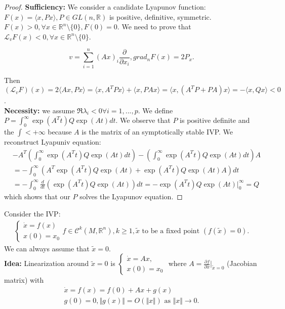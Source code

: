 \documentclass{article}
\theoremstyle{named}
\begin{document}
	
\begin{proof}
	\textbf{Sufficiency:} We consider a candidate Lyapunov function: $F(x) = \langle x, Px \rangle, P \in GL(n, \mathbb R)$ is positive, definitive, symmetric.\\
	
	$F(x) > 0, \forall x \in \mathbb R^n  \setminus \{0 \}, F(0) = 0.$ We need to prove that $\mathcal L_vF(x) < 0, \forall x \in \mathbb R^n \setminus \{  0 \}$. 
	
	\[
		v = \sum^n_{i=1} (Ax)_i \frac{\partial}{\partial x_i}, grad_n F(x) = 2 P_x.
	\]
	
	Then $(\mathcal L_v F)(x) = 2 \langle Ax, Px \rangle = \langle x , A^TPx \rangle + \langle x, PAx \rangle = \langle x, (A^TP+PA)x \rangle = - \langle x,Qx \rangle < 0$. \\
	
	\textbf{Necessity:} we assume $\Re \lambda_i < 0 \forall i=1,...,p$. We define $P = \int^\infty_0 \exp(A^Tt) Q \exp(At) dt$. We observe that $P$ is positive definite and the $\int < + \infty$ because $A$ is the matrix of an symptotically stable IVP. We reconstruct Lyapuniv equation: 
	\begin{align*}
		&- A^T (\int^\infty_0 \exp(A^Tt) Q \exp(At) dt) - (\int^\infty_0 \exp(A^Tt) Q\exp(At)dt)A \\
		&= - \int^\infty_0(A^T \exp(A^Tt) Q\exp(At) + \exp(A^Tt)Q\exp(At)A)dt \\
		&= - \int^\infty_0 \frac{d}{dt} (\exp(A^Tt)Q \exp(At)) dt = - \exp(A^Tt)Q\exp(At) \Big \vert^\infty_0 = Q
	\end{align*}
	which shows that our $P$ solves the Lyapunov equation.
\end{proof}

Consider the IVP:
\begin{align*}
\begin{cases}
\dot x = f(x) \\x(0) = x_0
\end{cases}
f \in \mathcal C^k(M, \mathbb R^n), k \geq 1, \tilde x \text{ to be a fixed point }(f(\tilde x) = 0).
\end{align*}
We can always assume that $\tilde x = 0$. \\

\textbf{Idea:} Linearization around $\tilde x = 0$ is $\begin{cases}\dot x = Ax,\\ x(0) = x_0\end{cases}$ where $A = \frac{\partial f}{\partial x} \Big \vert_{\tilde x = 0}$ (Jacobian matrix) with
\begin{gather*}
\dot x = f(x) = f(0) + Ax + g(x) \\
g(0) = 0, \Vert g(x) \Vert = O(\Vert x \Vert) \text{ as } \Vert x \Vert \to 0.
\end{gather*}
\end{document}
